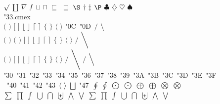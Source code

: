 \documentclass{article}
\begin{document}
$\surd$ $\amalg$ $\nabla$ $\smallint$ $\sqcup$ $\sqcap$ $\sqsubseteq$ $\sqsupseteq$ $\S$ $\dag$ $\ddag$ $\P$ $\clubsuit$ $\diamondsuit$ $\heartsuit$ $\spadesuit$\\ 
\selectfont\char"33.cmex\\
$\big($ $\big)$ $\big[$ $\big]$ $\big\lfloor$ $\big\rfloor$ $\big\lceil$ $\big\rceil$ $\big\{$ $\big\}$ $\big\langle$ $\big\rangle$ \selectfont\char"0C\  \selectfont\char"0D\ $\big/$ $\big\backslash$\\
$\Big($ $\Big)$ $\bigg($ $\bigg)$ $\bigg[$ $\bigg]$ $\bigg\lfloor$ $\bigg\rfloor$ $\bigg\lceil$ $\bigg\rceil$ $\bigg\{$ $\bigg\}$ $\bigg\langle$ $\bigg\rangle$ $\bigg/$ $\bigg\backslash$\\
$\Bigg($ $\Bigg)$ $\Bigg[$ $\Bigg]$ $\Bigg\lfloor$ $\Bigg\rfloor$ $\Bigg\lceil$ $\Bigg\rceil$ $\Bigg\{$ $\Bigg\}$ $\Bigg\langle$ $\Bigg\rangle$ $\Bigg/$ $\Bigg\backslash$ $\Big/$ $\Big\backslash$\\
 \selectfont\char"30\ \selectfont\char"31\ \selectfont\char"32\ \selectfont\char"33\ \selectfont\char"34\ \selectfont\char"35\ \selectfont\char"36\ \selectfont\char"37\ \selectfont\char"38\ \selectfont\char"39\ \selectfont\char"3A\ \selectfont\char"3B\ \selectfont\char"3C\ \selectfont\char"3D\ \selectfont\char"3E\ \selectfont\char"3F\\\
\selectfont\char"40\ \selectfont\char"41\ \selectfont\char"42\ \selectfont\char"43\ $\Big\langle$ $\Big\rangle$ $\bigsqcup$ \selectfont\char"47\  $\oint$ $\displaystyle\oint$ $\bigodot$ $\displaystyle\bigodot$ $\bigoplus$ $\displaystyle\bigoplus$ $\bigotimes$ $\displaystyle\bigotimes$\\
$\sum$ $\prod$ $\int$ $\bigcup$ $\bigcap$ $\biguplus$ $\bigwedge$ $\bigvee$ $\displaystyle\sum$ $\displaystyle\prod$ $\displaystyle\int$ $\displaystyle\bigcup$ $\displaystyle\bigcap$ $\displaystyle\biguplus$ $\displaystyle\bigwedge$ $\displaystyle\bigvee$\\
\end{document}

